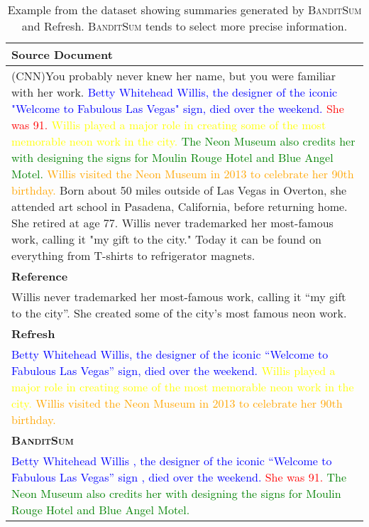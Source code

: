 \documentclass[11pt,a4paper]{article}
\newcommand{\B}{\textsc{BanditSum }}
\begin{document}
\begin{table}[h]
\begin{center}
\begin{tabularx}{\columnwidth}{|X|}
\hline
\textbf{Source Document} \\ 
\hline
(CNN)You probably never knew her name, but you were familiar with her work.
\textcolor{blue}{Betty Whitehead Willis, the designer of the iconic "Welcome to Fabulous Las Vegas" sign, died over the weekend.} 
\textcolor{red}{She was 91.}
\textcolor{yellow}{Willis played a major role in creating some of the most memorable neon work in the city.}
\textcolor{green}{The Neon Museum also credits her with designing the signs for Moulin Rouge Hotel and Blue Angel Motel.}
\textcolor{orange}{Willis visited the Neon Museum in 2013 to celebrate her 90th birthday.}
Born about 50 miles outside of Las Vegas in Overton, she attended art school in Pasadena, California, before returning home.
She retired at age 77.
Willis never trademarked her most-famous work, calling it "my gift to the city."
Today it can be found on everything from T-shirts to refrigerator magnets.
\\
\hline
\textbf{Reference} \\
\hline
Willis never trademarked her most-famous work, calling it ``my gift to the city''. She created some of the city's most famous neon work. \\
\hline
\textbf{Refresh}  \\ 
\hline
\textcolor{blue}{Betty Whitehead Willis, the designer of the iconic ``Welcome to Fabulous Las Vegas'' sign, died over the weekend.}
\textcolor{yellow}{Willis played a major role in creating some of the most memorable neon work in the city.} 
\textcolor{orange}{Willis visited the Neon Museum in 2013 to celebrate her 90th birthday.} \\
\hline
\textbf{\B} \\ 
\hline
\textcolor{blue}{Betty Whitehead Willis , the designer of the iconic ``Welcome to Fabulous Las Vegas'' sign , died over the weekend.} 
\textcolor{red}{She was 91.} 
\textcolor{green}{The Neon Museum also credits her with designing the signs for Moulin Rouge Hotel and Blue Angel Motel.} \\
\hline
\end{tabularx}
\end{center}
\caption{Example from the dataset showing summaries generated by \B and Refresh. \B tends to select more precise information.}
\label{table:sample1}
\end{table}
\end{document}
